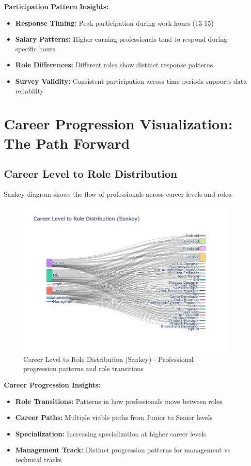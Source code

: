 \documentclass[12pt,a4paper]{article}
\begin{document}
\textbf{Participation Pattern Insights:}
\begin{itemize}
    \item \textbf{Response Timing:} Peak participation during work hours (13-15)
    \item \textbf{Salary Patterns:} Higher-earning professionals tend to respond during specific hours
    \item \textbf{Role Differences:} Different roles show distinct response patterns
    \item \textbf{Survey Validity:} Consistent participation across time periods supports data reliability
\end{itemize}

\section{Career Progression Visualization: The Path Forward}

\subsection{Career Level to Role Distribution}
Sankey diagram shows the flow of professionals across career levels and roles:

\begin{figure}[H]
    \centering
    \includegraphics[width=\textwidth]{figures/sankey_career_level_role.png}
    \caption{Career Level to Role Distribution (Sankey) - Professional progression patterns and role transitions}
\end{figure}

\textbf{Career Progression Insights:}
\begin{itemize}
    \item \textbf{Role Transitions:} Patterns in how professionals move between roles
    \item \textbf{Career Paths:} Multiple viable paths from Junior to Senior levels
    \item \textbf{Specialization:} Increasing specialization at higher career levels
    \item \textbf{Management Track:} Distinct progression patterns for management vs technical tracks
\end{itemize}
\end{document}
